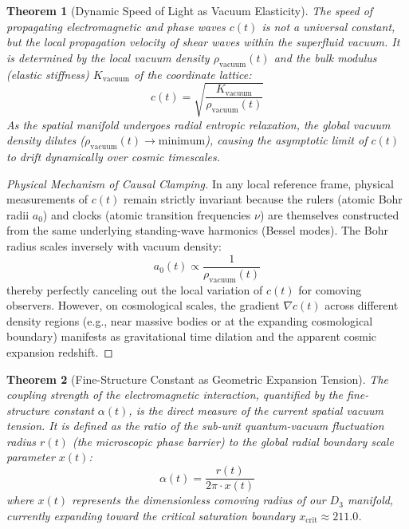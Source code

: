 \documentclass[11pt,a4paper]{article}
\theoremstyle{plain}
\newtheorem{theorem}{Theorem}[section] %
\theoremstyle{definition}
\theoremstyle{remark}
\begin{document}
\begin{theorem}[Dynamic Speed of Light as Vacuum Elasticity]
The speed of propagating electromagnetic and phase waves $c(t)$ is not a universal constant, but the local propagation velocity of shear waves within the superfluid vacuum. It is determined by the local vacuum density $\rho_{\text{vacuum}}(t)$ and the bulk modulus (elastic stiffness) $K_{\text{vacuum}}$ of the coordinate lattice:
\begin{equation}
c(t) = \sqrt{\frac{K_{\text{vacuum}}}{\rho_{\text{vacuum}}(t)}}
\end{equation}
As the spatial manifold undergoes radial entropic relaxation, the global vacuum density dilutes ($\rho_{\text{vacuum}}(t) \to \text{minimum}$), causing the asymptotic limit of $c(t)$ to drift dynamically over cosmic timescales.
\end{theorem}

\begin{proof}[Physical Mechanism of Causal Clamping]
In any local reference frame, physical measurements of $c(t)$ remain strictly invariant because the rulers (atomic Bohr radii $a_0$) and clocks (atomic transition frequencies $\nu$) are themselves constructed from the same underlying standing-wave harmonics (Bessel modes). 
The Bohr radius scales inversely with vacuum density:
\begin{equation}
a_0(t) \propto \frac{1}{\rho_{\text{vacuum}}(t)}
\end{equation}
thereby perfectly canceling out the local variation of $c(t)$ for comoving observers. However, on cosmological scales, the gradient $\nabla c(t)$ across different density regions (e.g., near massive bodies or at the expanding cosmological boundary) manifests as gravitational time dilation and the apparent cosmic expansion redshift.
\end{proof}

\begin{theorem}[Fine-Structure Constant as Geometric Expansion Tension]

The coupling strength of the electromagnetic interaction, quantified by the fine-structure constant $\alpha(t)$, is the direct measure of the current spatial vacuum tension. It is defined as the ratio of the sub-unit quantum-vacuum fluctuation radius $r(t)$ (the microscopic phase barrier) to the global radial boundary scale parameter $x(t)$:
\begin{equation}
\alpha(t) = \frac{r(t)}{2\pi \cdot x(t)}
\end{equation}
where $x(t)$ represents the dimensionless comoving radius of our $D_3$ manifold, currently expanding toward the critical saturation boundary $x_{\text{crit}} \approx 211.0$.

\end{theorem}
\end{document}
